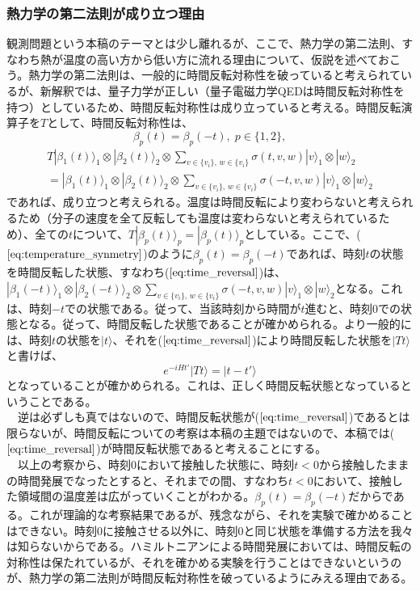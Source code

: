 \subsubsection{熱力学の第二法則が成り立つ理由}
観測問題という本稿のテーマとは少し離れるが、ここで、熱力学の第二法則、すなわち熱が温度の高い方から低い方に流れる理由について、仮説を述べておこう。熱力学の第二法則は、一般的に時間反転対称性を破っていると考えられているが、新解釈では、量子力学が正しい（量子電磁力学QEDは時間反転対称性を持つ）としているため、時間反転対称性は成り立っていると考える。時間反転演算子を$T$として、時間反転対称性は、
\begin{equation}
\label{eq:temperature_synmetry}
    \beta_p(t) = \beta_p(-t), \; p \in \{1,2\},
\end{equation}
\begin{align}
\label{eq:time_reversal}
 T|\beta_1(t) \rangle_1 \otimes |\beta_2(t)\rangle_2 \otimes   \sum_{v \in \{v_i\} ,\, w \in \{v_i\}} \sigma(t,v,w)|v\rangle_1 \otimes |w\rangle_2 \\
 =|\beta_1(t) \rangle_1 \otimes |\beta_2(t)\rangle_2 \otimes   \sum_{v \in \{v_i\} ,\, w \in \{v_i\}} \sigma(-t,v,w)|v\rangle_1 \otimes |w\rangle_2
\end{align}
であれば、成り立つと考えられる。温度は時間反転により変わらないと考えられるため（分子の速度を全て反転しても温度は変わらないと考えられているため）、全ての$t$について、$T|\beta_p(t) \rangle_p = |\beta_p(t) \rangle_p$としている。ここで、($\ref{eq:temperature_synmetry}$)のように$\beta_p(t) = \beta_p(-t)$であれば、時刻$t$の状態を時間反転した状態、すなわち($\ref{eq:time_reversal}$)は、$|\beta_1(-t) \rangle_1 \otimes |\beta_2(-t)\rangle_2 \otimes \sum_{v \in \{v_i\} ,\, w \in \{v_i\}} \sigma(-t,v,w)|v\rangle_1 \otimes |w\rangle_2$となる。これは、時刻$-t$での状態である。従って、当該時刻から時間が$t$進むと、時刻$0$での状態となる。従って、時間反転した状態であることが確かめられる。より一般的には、時刻$t$の状態を$|t\rangle$、それを($\ref{eq:time_reversal}$)により時間反転した状態を$|Tt\rangle$と書けば、
\begin{equation}
e^{-iHt'}|Tt\rangle = |t-t'\rangle
\end{equation}
となっていることが確かめられる。これは、正しく時間反転状態となっているということである。\\
　逆は必ずしも真ではないので、時間反転状態が($\ref{eq:time_reversal}$)であるとは限らないが、時間反転についての考察は本稿の主題ではないので、本稿では($\ref{eq:time_reversal}$)が時間反転状態であると考えることにする。\\
　以上の考察から、時刻$0$において接触した状態に、時刻$t<0$から接触したままの時間発展でなったとすると、それまでの間、すなわち$t<0$において、接触した領域間の温度差は広がっていくことがわかる。$\beta_p(t) = \beta_p(-t)$だからである。これが理論的な考察結果であるが、残念ながら、それを実験で確かめることはできない。時刻$0$に接触させる以外に、時刻$0$と同じ状態を準備する方法を我々は知らないからである。ハミルトニアンによる時間発展においては、時間反転の対称性は保たれているが、それを確かめる実験を行うことはできないというのが、熱力学の第二法則が時間反転対称性を破っているようにみえる理由である。\\
